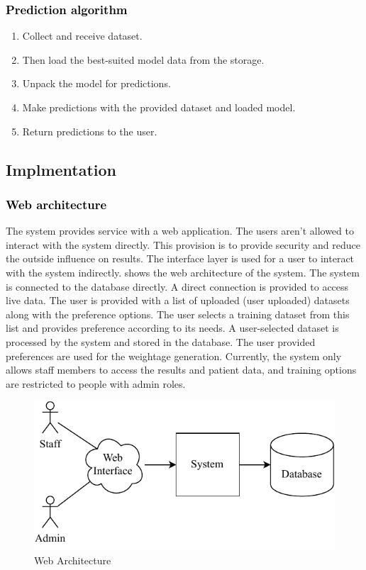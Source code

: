 \documentclass[a4paper,fleqn]{cas-dc}
\newcommand{\responsemodsm}[1]{\textcolor{black}{#1}}
\newcommand{\subsubsectionb}[1]{\subsubsection{\responsemodsm{#1}}}
\begin{document}
\vspace{-0.5em}

\subsubsectionb{Prediction algorithm}\label{subsubsec:prediction_algorithm}
\vspace{0.5em}
\begin{enumerate}
    \item Collect and receive dataset.
    \item Then load the best-suited model data from the storage.
    \item Unpack the model for predictions.
    \item Make predictions with the provided dataset and loaded model.
    \item Return predictions to the user.
\end{enumerate}

\subsection{Implmentation}\label{subsec:implmentation}

\subsubsectionb{Web architecture}\label{subsubsec:web_architecture}

The system provides service with a web application. The users aren't allowed to interact with the system directly. This provision is to provide security and reduce the outside influence on results. The interface layer is used for a user to interact with the system indirectly.  shows the web architecture of the system. The system is connected to the database directly. A direct connection is provided to access live data. The user is provided with a list of uploaded (user uploaded) datasets along with the preference options. The user selects a training dataset from this list and provides preference according to its needs. A user-selected dataset is processed by the system and stored in the database. The user provided preferences are used for the weightage generation. Currently, the system only allows staff members to access the results and patient data, and training options are restricted to people with admin roles.

\begin{figure}[ht]
    \centering
    \includegraphics[width=0.9\columnwidth]{web_architecture.pdf}
    \caption{Web Architecture}
    \label{fig:web_architecture}
\end{figure}
\end{document}
